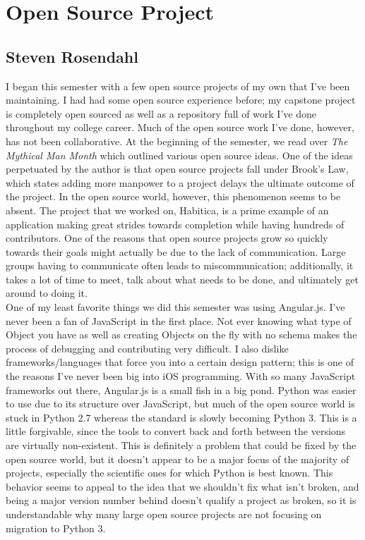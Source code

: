 \documentclass[12pt]{article}
\begin{document}
\section*{Open Source Project}
\subsection*{Steven Rosendahl}

I began this semester with a few open source projects of my own that I've been maintaining. I had had some open source experience before; my capstone project is completely open sourced as well as a repository full of work I've done throughout my college career. Much of the open source work I've done, however, has not been collaborative. At the beginning of the semester, we read over \textit{The Mythical Man Month} which outlined various open source ideas. One of the ideas perpetuated by the author is that open source projects fall under Brook's Law, which states adding more manpower to a project delays the ultimate outcome of the project. In the open source world, however, this phenomenon seems to be absent. The project that we worked on, Habitica, is a prime example of an application making great strides towards completion while having hundreds of contributors. One of the reasons that open source projects grow so quickly towards their goals might actually be due to the lack of communication. Large groups having to communicate often leads to miscommunication; additionally, it takes a lot of time to meet, talk about what needs to be done, and ultimately get around to doing it.\\

One of my least favorite things we did this semester was using Angular.js. I've never been a fan of JavaScript in the first place. Not ever knowing what type of Object you have as well as creating Objects on the fly with no schema makes the process of debugging and contributing very difficult. I also dislike frameworks/languages that force you into a certain design pattern; this is one of the reasons I've never been big into iOS programming. With so many JavaScript frameworks out there, Angular.js is a small fish in a big pond. Python was easier to use due to its structure over JavaScript, but much of the open source world is stuck in Python 2.7 whereas the standard is slowly becoming Python 3. This is a little forgivable, since the tools to convert back and forth between the versions are virtually non-existent. This is definitely a problem that could be fixed by the open source world, but it doesn't appear to be a major focus of the majority of projects, especially the scientific ones for which Python is best known. This behavior seems to appeal to the idea that we shouldn't fix what isn't broken, and being a major version number behind doesn't qualify a project as broken, so it is understandable why many large open source projects are not focusing on migration to Python 3.\\
\end{document}
